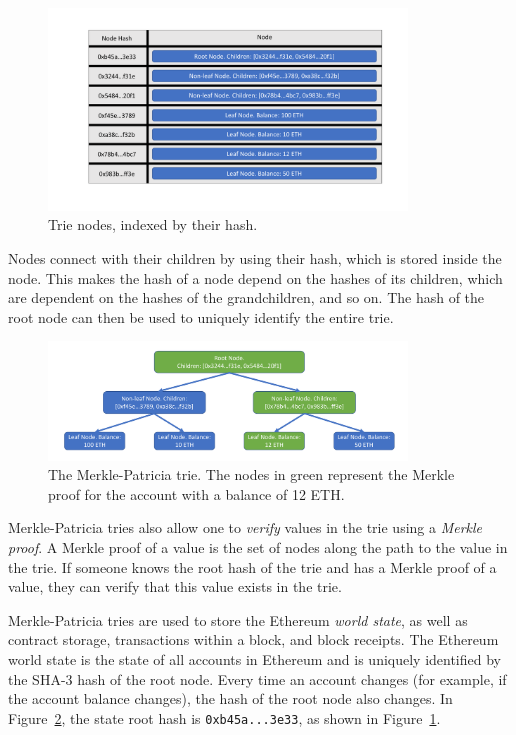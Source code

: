 \documentclass[12pt]{article}
\newcommand{\figurewidth}{0.85\textwidth}
\begin{document}
\begin{figure}[H]
  \centering
  \includegraphics[width=\figurewidth]{../figures/background/trie/tree_nodes.pdf}
  \caption{Trie nodes, indexed by their hash.} \label{fig:trienodes}
\end{figure}

Nodes connect with their children by using their hash, which is stored inside the node. This makes the hash of a node depend on the hashes of its children, which are dependent on the hashes of the grandchildren, and so on. The hash of the root node can then be used to uniquely identify the entire trie.

\begin{figure}[H]
  \centering
  \includegraphics[width=\figurewidth]{../figures/background/trie/tree_with_merkle_proof.pdf}
  \caption{The Merkle-Patricia trie. The nodes in green represent the Merkle proof for the account with a balance of 12 ETH.} \label{fig:trie}
\end{figure}

Merkle-Patricia tries also allow one to \emph{verify} values in the trie using a \emph{Merkle proof}. A Merkle proof of a value is the set of nodes along the path to the value in the trie. If someone knows the root hash of the trie and has a Merkle proof of a value, they can verify that this value exists in the trie.


Merkle-Patricia tries are used to store the Ethereum \emph{world state}, as well as contract storage, transactions within a block, and block receipts. The Ethereum world state is the state of all accounts in Ethereum and is uniquely identified by the SHA-3 hash of the root node. Every time an account changes (for example, if the account balance changes), the hash of the root node also changes. In Figure~\ref{fig:trie}, the state root hash is \texttt{0xb45a...3e33}, as shown in Figure~\ref{fig:trienodes}.
\end{document}
